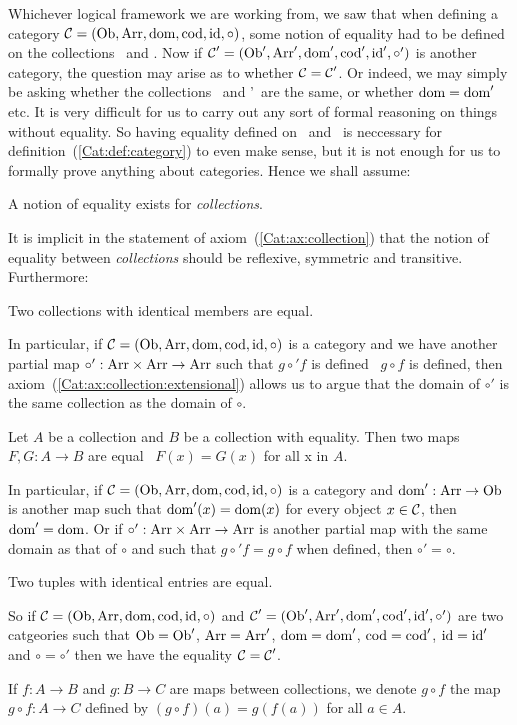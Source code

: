 Whichever logical framework we are working from, we saw that when defining
a category $\mbox{$\cal C$}=(\mbox{\rm Ob}, \mbox{\rm Arr}, \mbox{\rm dom}, \mbox{\rm cod}, \mbox{\rm id}, \circ)$, some notion of
equality had to be defined on the collections \ob\ and \arr. Now if
$\mbox{$\cal C$}'=(\mbox{\rm Ob}', \mbox{\rm Arr}', \mbox{\rm dom}', \mbox{\rm cod}', \mbox{\rm id}', \circ')$ is another category,
the question may arise as to whether $\mbox{$\cal C$}=\mbox{$\cal C$}'$. Or indeed, we may 
simply be asking whether the collections \ob\ and \ob'\ are the same,
or whether $\mbox{\rm dom}=\mbox{\rm dom}'$ etc. It is very difficult for us to carry out
any sort of formal reasoning on things without equality. So having
equality defined on \ob\ and \arr\ is neccessary for
definition~(\ref{Cat:def:category}) to even make sense, but it is not
enough for us to formally prove anything about categories. Hence we shall
assume:

\begin{axiom}\label{Cat:ax:collection}
    A notion of equality exists for {\em collections}.
\end{axiom}

\noindent
It is implicit in the statement of axiom~(\ref{Cat:ax:collection})
that the notion of equality between {\em collections} should 
be reflexive, symmetric and transitive. Furthermore:

\begin{axiom}\label{Cat:ax:collection:extensional}
    Two collections with identical members are equal.
\end{axiom}
In particular, if $\mbox{$\cal C$}=(\mbox{\rm Ob}, \mbox{\rm Arr}, \mbox{\rm dom}, \mbox{\rm cod}, \mbox{\rm id}, \circ)$ is
a category and we have another partial map $\circ':\mbox{\rm Arr}\times\mbox{\rm Arr}\to\mbox{\rm Arr}$ 
such that $g\circ' f$ is defined \ifand\ $g\circ f$ is defined,
then axiom~(\ref{Cat:ax:collection:extensional}) allows us to argue 
that the domain of $\circ'$ is the same collection as the domain
of $\circ$.

\begin{axiom}\label{Cat:ax:map:extensional}
    Let $A$ be a collection and $B$ be a collection with equality.
    Then two maps $F,G:A\to B$ are equal \ifand\ $F(x)=G(x)$ for all x in $A$.
\end{axiom}
In particular, if $\mbox{$\cal C$}=(\mbox{\rm Ob}, \mbox{\rm Arr}, \mbox{\rm dom}, \mbox{\rm cod}, \mbox{\rm id}, \circ)$ is a 
category and $\mbox{\rm dom}':\mbox{\rm Arr}\to\mbox{\rm Ob}$ is another map such that $\mbox{\rm dom}'(x)=\mbox{\rm dom}(x)$
for every object $x\in\mbox{$\cal C$}$, then $\mbox{\rm dom}'=\mbox{\rm dom}$. Or if $\circ':\mbox{\rm Arr}\times\mbox{\rm Arr}\to\mbox{\rm Arr}$ 
is another partial map  with the same domain as that of $\circ$ and such that 
$g\circ' f = g\circ f$ when defined, then $\circ'=\circ$.

\begin{axiom}\label{Cat:ax:tuple:extensional}
    Two tuples with identical entries are equal.
\end{axiom}
So if $\mbox{$\cal C$}=(\mbox{\rm Ob}, \mbox{\rm Arr}, \mbox{\rm dom}, \mbox{\rm cod}, \mbox{\rm id}, \circ)$ and
$\mbox{$\cal C$}'=(\mbox{\rm Ob}', \mbox{\rm Arr}', \mbox{\rm dom}', \mbox{\rm cod}', \mbox{\rm id}', \circ')$ are two catgeories
such that $\mbox{\rm Ob}=\mbox{\rm Ob}'$, $\mbox{\rm Arr}=\mbox{\rm Arr}'$, $\mbox{\rm dom}=\mbox{\rm dom}'$, $\mbox{\rm cod}=\mbox{\rm cod}'$,
$\mbox{\rm id}=\mbox{\rm id}'$ and $\circ=\circ'$ then we have the equality $\mbox{$\cal C$}=\mbox{$\cal C$}'$.

\begin{notation}\label{Cat:ax:composition}
    If $f:A\to B$ and $g:B\to C$ are maps between collections,
    we denote $g\circ f$ the map $g\circ f:A\to C$ defined by 
    $(g\circ f)(a) = g(f(a))$ for all $a\in A$.
\end{notation}
